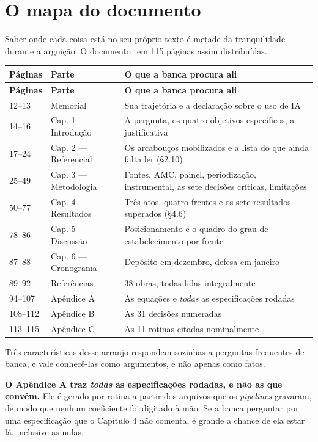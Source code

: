 \chapter{O mapa do documento}

Saber onde cada coisa está no seu próprio texto é metade da tranquilidade
durante a arguição. O documento tem 115 páginas assim distribuídas.

\vspace{6pt}
\begin{longtable}{@{}p{1.9cm}p{3.2cm}p{9.6cm}@{}}
\toprule
\textbf{Páginas} & \textbf{Parte} & \textbf{O que a banca procura ali} \\
\midrule
\endfirsthead
\toprule
\textbf{Páginas} & \textbf{Parte} & \textbf{O que a banca procura ali} \\
\midrule
\endhead
12--13 & Memorial & Sua trajetória e a declaração sobre o uso de IA \\
14--16 & Cap. 1 --- Introdução & A pergunta, os quatro objetivos específicos, a justificativa \\
17--24 & Cap. 2 --- Referencial & Os arcabouços mobilizados e a lista do que ainda falta ler (§2.10) \\
25--49 & Cap. 3 --- Metodologia & Fontes, AMC, painel, periodização, instrumental, as sete decisões críticas, limitações \\
50--77 & Cap. 4 --- Resultados & Três atos, quatro frentes e os sete resultados superados (§4.6) \\
78--86 & Cap. 5 --- Discussão & Posicionamento e o quadro do grau de estabelecimento por frente \\
87--88 & Cap. 6 --- Cronograma & Depósito em dezembro, defesa em janeiro \\
89--92 & Referências & 38 obras, todas lidas integralmente \\
94--107 & Apêndice A & As equações e \emph{todas} as especificações rodadas \\
108--112 & Apêndice B & As 31 decisões numeradas \\
113--115 & Apêndice C & As 11 rotinas citadas nominalmente \\
\bottomrule
\end{longtable}

\vspace{12pt}
Três características desse arranjo respondem sozinhas a perguntas frequentes de
banca, e vale conhecê-las como argumentos, e não apenas como fatos.

\vspace{4pt}
\textbf{O Apêndice A traz \emph{todas} as especificações rodadas, e não as que
convêm.} Ele é gerado por rotina a partir dos arquivos que os \emph{pipelines}
gravaram, de modo que nenhum coeficiente foi digitado à mão. Se a banca
perguntar por uma especificação que o Capítulo 4 não comenta, é grande a chance
de ela estar lá, inclusive as nulas.

